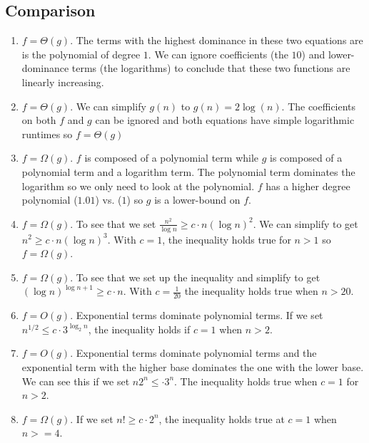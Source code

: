 \documentclass{article}
\begin{document}
\newpage

\subsection{Comparison}


\begin{enumerate}[label=(\alph*)]
    \item \(f = \Theta(g)\). The terms with the highest dominance in these two equations are is the polynomial of degree \(1\). We can ignore coefficients (the \(10\)) and lower-dominance terms (the logarithms) to conclude that these two functions are linearly increasing.
    
    \item \(f = \Theta (g)\). We can simplify \(g(n)\) to \(g(n) = 2\log(n)\). The coefficients on both \(f\) and \(g\) can be ignored and both equations have simple logarithmic runtimes so \(f = \Theta(g)\)
    
    \item \(f = \Omega(g)\). \(f\) is composed of a polynomial term while \(g\) is composed of a polynomial term and a logarithm term. The polynomial term dominates the logarithm so we only need to look at the polynomial. \(f\) has a higher degree polynomial (\(1.01\)) vs. (\(1\)) so \(g\) is a lower-bound on \(f\).
    
    \item \(f = \Omega(g)\). To see that we set \(\frac{n^2}{\log n} \geq c\cdot n(\log n)^2\). We can simplify to get \(n^2 \geq c\cdot n(\log n)^3\). With \(c=1\), the inequality holds true for \(n > 1\) so \(f = \Omega(g)\).
    
    \item \(f = \Omega(g)\). To see that we set up the inequality and simplify to get \((\log n)^{\log n + 1} \geq c \cdot n\). With \(c = \frac{1}{20}\) the inequality holds true when \(n > 20\).
    
    \item \(f = O(g)\). Exponential terms dominate polynomial terms. If we set \(n^{1/2} \leq c \cdot 3^{\log_2 n}\), the inequality holds if \(c = 1\) when \(n > 2\).
    
    \item \(f = O(g)\). Exponential terms dominate polynomial terms and the exponential term with the higher base dominates the one with the lower base. We can see this if we set \(n2^n \leq \cdot 3^n\). The inequality holds true when \(c = 1\) for \(n >2\).
    
    \item \(f = \Omega(g)\). If we set \(n! \geq c\cdot 2^n\), the inequality holds true at \(c = 1\) when \(n >= 4\).
    

\end{enumerate}
\end{document}
